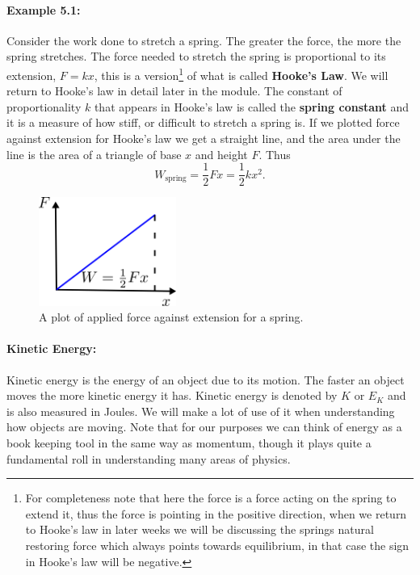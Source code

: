 \documentclass[a4paper,12pt]{book}
\begin{document}
\paragraph{Example 5.1:} Consider the work done to stretch a spring. The greater the force, the more the spring stretches. The force needed to stretch the spring is proportional to its extension, $F= kx$, this is a version\footnote{For completeness note that here the force is a force acting on the spring to extend it, thus the force is pointing in the positive direction, when we return to Hooke's law in later weeks we will be discussing the springs natural restoring force which always points towards equilibrium, in that case the sign in Hooke's law will be negative.} of what is called \textbf{Hooke's Law}. We will return to Hooke's law in detail later in the module. The constant of proportionality $k$ that appears in Hooke's law is called the \textbf{spring constant} and it is a measure of how stiff, or difficult to stretch a spring is. If we plotted force against extension for Hooke's law we get a straight line, and the area under the line is the area of a triangle of base $x$ and height $F$. Thus
\begin{equation*}
W_{\text{spring}}=\frac{1}{2}F x=\frac{1}{2}k x^{2}.
\end{equation*}

\begin{figure}[ht]
    \centering
    \includegraphics[width=0.4\textwidth]{figures/spring_work.png}
    \caption{A plot of applied force against extension for a spring.}
    \label{fig: spring extension}
\end{figure}


\paragraph{Kinetic Energy:} Kinetic energy is the energy of an object due to its motion. The faster an object moves the more kinetic energy it has. Kinetic energy is denoted by $K$ or $E_{K}$ and is also measured in Joules. We will make a lot of use of it when understanding how objects are moving. Note that for our purposes we can think of energy as a book keeping tool in the same way as momentum, though it plays quite a fundamental roll in understanding many areas of physics.\\
\end{document}
